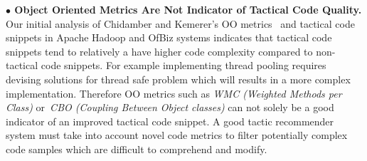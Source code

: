 \noindent \textbf{$\bullet$ Object Oriented Metrics Are Not Indicator of Tactical Code Quality.}
Our initial analysis of Chidamber and Kemerer's OO metrics~\cite{491650} and tactical code snippets in Apache Hadoop and OfBiz systems indicates that tactical code snippets tend to relatively a have higher code complexity compared to non-tactical code snippets. For example implementing thread pooling requires devising solutions for thread safe problem which will results in a more complex implementation. Therefore OO metrics such as \emph{WMC (Weighted Methods per Class)} or~\emph{CBO (Coupling Between Object classes)} can not solely be a good indicator of an improved tactical code snippet. A good tactic recommender system must take into account novel code metrics to filter potentially complex code samples which are difficult to comprehend and modify.
